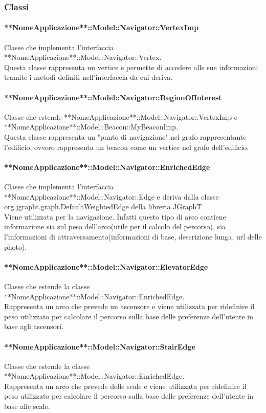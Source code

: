 \documentclass[../SpecificaTecnica.tex]{subfiles}
\begin{document}
			\subsubsection{Classi}
				\paragraph{**NomeApplicazione**::Model::Navigator::VertexImp}
					Classe che implementa l'interfaccia **NomeApplicazione**::Model::Navigator::Vertex. \\
					Questa classe rappresenta un vertice e permette di accedere alle sue informazioni tramite i metodi definiti nell'interfaccia da cui deriva.
				\paragraph{**NomeApplicazione**::Model::Navigator::RegionOfInterest}
					Classe che estende **NomeApplicazione**::Model::Navigator::VertexImp e **NomeApplicazione**::Model::Beacon::MyBeaconImp. \\
					Questa classe rappresenta un "punto di navigazione" nel grafo rappresentante l'edificio, ovvero rappresenta un beacon come un vertice nel grafo dell'edificio.
				\paragraph{**NomeApplicazione**::Model::Navigator::EnrichedEdge}
					Classe che implementa l'interfaccia **NomeApplicazione**::Model::Navigator::Edge e deriva dalla classe org.jgrapht.graph.DefaultWeightedEdge della libreria JGraphT. \\
					Viene utilizzata per la navigazione. Infatti questo tipo di arco contiene informazione sia sul peso dell'arco(utile per il calcolo del percorso), sia l'informazioni di attraversamento(informazioni di base, descrizione lunga, url delle photo).
				\paragraph{**NomeApplicazione**::Model::Navigator::ElevatorEdge}
					Classe che estende la classe **NomeApplicazione**::Model::Navigator::EnrichedEdge. \\
					Rappresenta un arco che prevede un ascensore e viene utilizzata per ridefinire il peso utilizzato per calcolare il percorso sulla base delle preferenze dell'utente in base agli ascensori.
				\paragraph{**NomeApplicazione**::Model::Navigator::StairEdge}
					Classe che estende la classe **NomeApplicazione**::Model::Navigator::EnrichedEdge. \\
					Rappresenta un arco che prevede delle scale e viene utilizzata per ridefinire il peso utilizzato per calcolare il percorso sulla base delle preferenze dell'utente in base alle scale.
\end{document}
